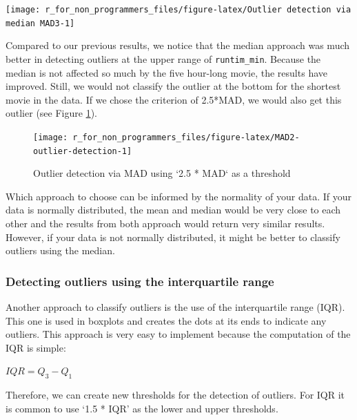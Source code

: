 \documentclass[
]{book}
\begin{document}
\begin{center}\texttt{[image: r\_for\_non\_programmers\_files/figure-latex/Outlier detection via median MAD3-1]} \end{center}

Compared to our previous results, we notice that the median approach was much better in detecting outliers at the upper range of \texttt{runtim\_min}. Because the median is not affected so much by the five hour-long movie, the results have improved. Still, we would not classify the outlier at the bottom for the shortest movie in the data. If we chose the criterion of 2.5*MAD, we would also get this outlier (see Figure \ref{fig:MAD2-outlier-detection}).

\begin{figure}

{\centering \texttt{[image: r\_for\_non\_programmers\_files/figure-latex/MAD2-outlier-detection-1]} 

}

\caption{Outlier detection via MAD using `2.5 * MAD` as a threshold}\label{fig:MAD2-outlier-detection}
\end{figure}

Which approach to choose can be informed by the normality of your data. If your data is normally distributed, the mean and median would be very close to each other and the results from both approach would return very similar results. However, if your data is not normally distributed, it might be better to classify outliers using the median.

\hypertarget{outliers-iqr}{%
\subsubsection{Detecting outliers using the interquartile range}\label{outliers-iqr}}

Another approach to classify outliers is the use of the interquartile range (IQR). This one is used in boxplots and creates the dots at its ends to indicate any outliers. This approach is very easy to implement because the computation of the IQR is simple:

\leavevmode\hypertarget{iqr-formula}{}%
\(IQR = Q_{3}-Q_{1}\)

Therefore, we can create new thresholds for the detection of outliers. For IQR it is common to use `1.5 * IQR' as the lower and upper thresholds.
\end{document}
